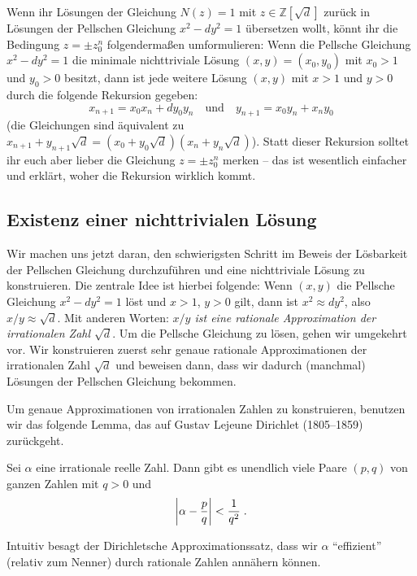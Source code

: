Wenn ihr Lösungen der Gleichung $N(z)=1$ mit $z\in\mathbb Z[\sqrt{d}]$ zurück in Lösungen der Pellschen Gleichung $x^2-dy^2=1$ übersetzen wollt, könnt ihr die Bedingung $z=\pm z_0^n$ folgendermaßen umformulieren: Wenn die Pellsche Gleichung $x^2-dy^2=1$ die minimale nichttriviale Lösung $(x,y)=(x_0,y_0)$ mit $x_0>1$ und $y_0>0$ besitzt, dann ist jede weitere Lösung $(x,y)$ mit $x>1$ und $y>0$ durch die folgende Rekursion gegeben:
\begin{equation*}
	x_{n+1}=x_0x_n+dy_0y_n\quad\text{und}\quad y_{n+1}=x_0y_n+x_ny_0
\end{equation*}
(die Gleichungen sind äquivalent zu $x_{n+1}+y_{n+1}\sqrt{d}=(x_0+y_0\sqrt{d})(x_n+y_n\sqrt{d})$). Statt dieser Rekursion solltet ihr euch aber lieber die Gleichung $z=\pm z_0^n$ merken -- das ist wesentlich einfacher und erklärt, woher die Rekursion wirklich kommt.

\subsection*{Existenz einer nichttrivialen Lösung}
Wir machen uns jetzt daran, den schwierigsten Schritt im Beweis der Lösbarkeit der Pellschen Gleichung durchzuführen und eine nichttriviale Lösung zu konstruieren. Die zentrale Idee ist hierbei folgende: Wenn $(x,y)$ die Pellsche Gleichung $x^2-dy^2=1$ löst und $x>1$, $y>0$ gilt, dann ist $x^2\approx dy^2$, also $x/y\approx \sqrt{d}$. Mit anderen Worten: \emph{$x/y$ ist eine rationale Approximation der irrationalen Zahl $\sqrt{d}$}. Um die Pellsche Gleichung zu lösen, gehen wir umgekehrt vor. Wir konstruieren zuerst sehr genaue rationale Approximationen der irrationalen Zahl $\sqrt{d}$ und beweisen dann, dass wir dadurch (manchmal) Lösungen der Pellschen Gleichung bekommen.

Um genaue Approximationen von irrationalen Zahlen zu konstruieren, benutzen wir das folgende Lemma, das auf Gustav Lejeune Dirichlet (1805--1859) zurückgeht.

\begin{satzmitnamen}
	Sei $\alpha$ eine irrationale reelle Zahl. Dann gibt es unendlich viele Paare $(p,q)$ von ganzen Zahlen mit $q>0$ und
	\begin{equation*}
		\abs*{\alpha-\frac{p}{q}}<\frac{1}{q^2}\;.
	\end{equation*}
\end{satzmitnamen}
Intuitiv besagt der Dirichletsche Approximationssatz, dass wir $\alpha$ \enquote{effizient} (relativ zum Nenner) durch rationale Zahlen annähern können.

